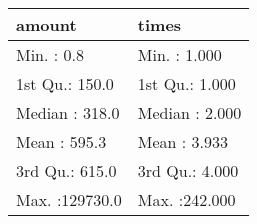 \begin{table}[ht]
\centering
\begin{tabular}{ll}
  \hline
    amount &     times \\ 
  \hline
Min.   :     0.8   & Min.   :  1.000   \\ 
  1st Qu.:   150.0   & 1st Qu.:  1.000   \\ 
  Median :   318.0   & Median :  2.000   \\ 
  Mean   :   595.3   & Mean   :  3.933   \\ 
  3rd Qu.:   615.0   & 3rd Qu.:  4.000   \\ 
  Max.   :129730.0   & Max.   :242.000   \\ 
   \hline
\end{tabular}
\end{table}
